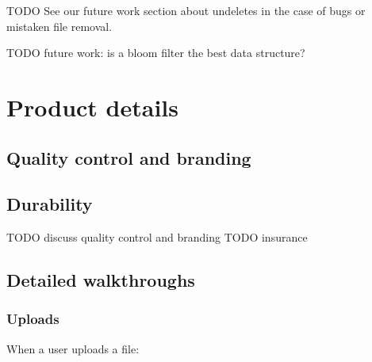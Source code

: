 \documentclass[a4paper,10pt]{article} \usepackage[utf8]{inputenc}
\newcommand{\todo}[1]{{\color{red} TODO #1 }}
\begin{document}
\todo{See our future work section about undeletes in
the case of bugs or mistaken file removal.}

\todo{future work: is a bloom filter the best data structure?}

\section{Product details}\label{sec:product_details}

\subsection{Quality control and branding}
\subsection{Durability}

\todo{discuss quality control and branding}
\todo{insurance}

\subsection{Detailed walkthroughs}

\subsubsection{Uploads}

When a user uploads a file:
\end{document}
